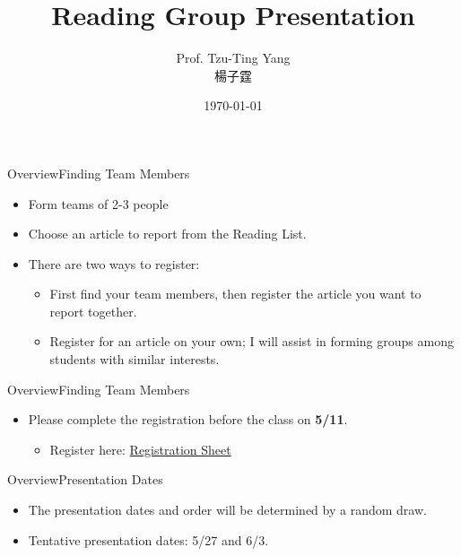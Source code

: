 \documentclass[hyperref={pdfpagelabels=false}]{beamer}
\title[]  
{Reading Group Presentation}
\author 
{Prof. Tzu-Ting Yang  \\ 楊子霆}
\institute{Institute of Economics, Academia Sinica  \\ 中央研究院經濟研究所}
\date
{\today}
\begin{document}
\begin{frame}{}
 \titlepage
\end{frame}


\begin{frame}{Overview}{Finding Team Members}
	\begin{itemize}
		\item Form teams of 2-3 people
				\vspace{0.2cm}
		\item Choose an article to report from the Reading List. 
						\vspace{0.2cm}
		\item There are two ways to register:
		\begin{itemize}
			\item First find your team members, then register the article you want to report together.
							\vspace{0.2cm}
			\item Register for an article on your own; I will assist in forming groups among students with similar interests.
							\vspace{0.2cm}
		\end{itemize}
	
		
		
	\end{itemize}
\end{frame}




\begin{frame}{Overview}{Finding Team Members}
	\begin{itemize}
	
		\item Please complete the registration before the class on \textbf{5/11}.
					\vspace{0.2cm}
				\begin{itemize}
		
		\item Register here: \href{https://docs.google.com/spreadsheets/d/1DoeHlJpMBXCUmbUW7kNPMRgAaJJ3Joqs/edit?gid=1810002485\#gid=1810002485}{Registration Sheet}
		
				\end{itemize}
	\end{itemize}
\end{frame}


\begin{frame}{Overview}{Presentation Dates}
	\begin{itemize}
		\item The presentation dates and order will be determined by a random draw.
									\vspace{0.2cm}
		\item Tentative presentation dates: 5/27 and 6/3.
	\end{itemize}
\end{frame}
\end{document}
